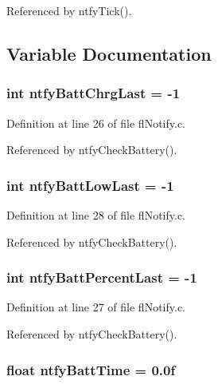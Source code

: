 Referenced by ntfy\-Tick().

\subsection{Variable Documentation}
\subsubsection{\setlength{\rightskip}{0pt plus 5cm}int {\bf ntfy\-Batt\-Chrg\-Last} = -1}\label{flNotify_8c_b0c871dc5759f171078a7e8e7786f2a3}




Definition at line 26 of file fl\-Notify.c.

Referenced by ntfy\-Check\-Battery().
\subsubsection{\setlength{\rightskip}{0pt plus 5cm}int {\bf ntfy\-Batt\-Low\-Last} = -1}\label{flNotify_8c_7e58df18b4f2d12477fc796b4a81a863}




Definition at line 28 of file fl\-Notify.c.

Referenced by ntfy\-Check\-Battery().
\subsubsection{\setlength{\rightskip}{0pt plus 5cm}int {\bf ntfy\-Batt\-Percent\-Last} = -1}\label{flNotify_8c_532036aa016bdf7f32aabcd3e93c82e0}




Definition at line 27 of file fl\-Notify.c.

Referenced by ntfy\-Check\-Battery().
\subsubsection{\setlength{\rightskip}{0pt plus 5cm}float {\bf ntfy\-Batt\-Time} = 0.0f}\label{flNotify_8c_03a203ba3c5858fc12ae1f76f74f944e}




